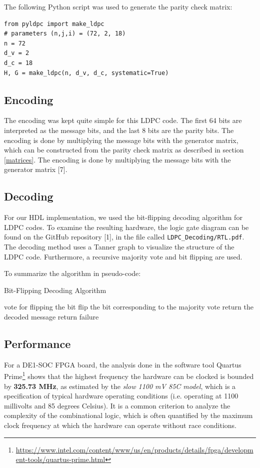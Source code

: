 \documentclass[conference]{IEEEtran}
\begin{document}
The following Python script was used to generate the parity check matrix:
\begin{verbatim}
from pyldpc import make_ldpc
# parameters (n,j,i) = (72, 2, 18)
n = 72
d_v = 2
d_c = 18
H, G = make_ldpc(n, d_v, d_c, systematic=True)
\end{verbatim}

\subsection{Encoding}
The encoding was kept quite simple for this LDPC code.
The first 64 bits are interpreted as the message bits, and the last 8 bits are the parity bits.
The encoding is done by multiplying the message bits with the generator matrix, which can be constructed from the parity check matrix as described in section \ref{matrices}.
The encoding is done by multiplying the message bits with the generator matrix [7].
\subsection{Decoding}
For our HDL implementation, we used the bit-flipping decoding algorithm for LDPC codes.
To examine the resulting hardware, the logic gate diagram can be found on the GitHub repository [1], in the file called \verb+LDPC_Decoding/RTL.pdf+.
The decoding method uses a Tanner graph to visualize the structure of the LDPC code.
Furthermore, a recursive majority vote and bit flipping are used.

To summarize the algorithm in pseudo-code:
\begin{algorithm}
  \caption{Bit-Flipping Decoding Algorithm}
  \begin{algorithmic}
          \STATE vote for flipping the bit
        \ELSE
        \ENDIF
      \ENDFOR
      \STATE flip the bit corresponding to the majority vote
    \ENDWHILE
    \STATE return the decoded message
    \ELSE
    \STATE return failure
    \ENDIF
  \end{algorithmic}
\end{algorithm}

\subsection{Performance}
For a DE1-SOC FPGA board, the analysis done in the software tool Quartus Prime\footnote{\url{https://www.intel.com/content/www/us/en/products/details/fpga/development-tools/quartus-prime.html}} shows that the highest frequency the hardware can be clocked is bounded by \textbf{325.73 MHz}, as estimated by the \textit{slow 1100 mV 85C model}, which is a specification of typical hardware operating conditions (i.e. operating at 1100 millivolts and 85 degrees Celsius).
It is a common criterion to analyze the complexity of the combinational logic, which is often quantified by the maximum clock frequency at which the hardware can operate without race conditions.
\end{document}
